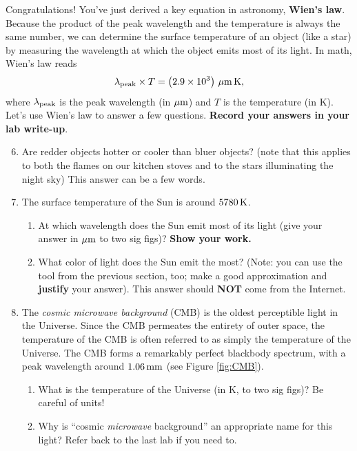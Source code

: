 \documentclass[11pt]{article}
\begin{document}
\medskip \noindent
Congratulations! You've just derived a key equation in astronomy, \textbf{Wien's law}. Because the product of the peak wavelength and the temperature is always the same number, we can determine the surface temperature of an object (like a star) by measuring the wavelength at which the object emits most of its light. In math, Wien's law reads
\begin{equation}
    \lambda_{\rm peak} \times T = \left(2.9 \times 10^3 \right) \, {\rm \mu m \, K},
\end{equation}
where $\lambda_{\rm peak}$ is the peak wavelength (in $\rm \mu m$) and $T$ is the temperature (in K). Let's use Wien's law to answer a few questions. \textbf{Record your answers in your lab write-up}.
\begin{enumerate}
    \setcounter{enumi}{5}
    
    \item Are redder objects hotter or cooler than bluer objects? (note that this applies to both the flames on our kitchen stoves and to the stars illuminating the night sky) This answer can be a few words.
    
    \item The surface temperature of the Sun is around $5780 \, {\rm K}$. 
    \begin{enumerate}
        \item At which wavelength does the Sun emit most of its light (give your answer in $\rm \mu m$ to two sig figs)? \textbf{Show your work.}
        \item What color of light does the Sun emit the most? (Note: you can use the tool from the previous section, too; make a good approximation and \textbf{justify} your answer). This answer should \textbf{NOT} come from the Internet.
    \end{enumerate} 
    
    \item The \emph{cosmic microwave background} (CMB) is the oldest perceptible light in the Universe. Since the CMB permeates the entirety of outer space, the temperature of the CMB is often referred to as simply the temperature of the Universe. The CMB forms a remarkably perfect blackbody spectrum, with a peak wavelength around $1.06 \, {\rm mm}$ (see Figure \ref{fig:CMB}). 
    \begin{enumerate}
        \item What is the temperature of the Universe (in K, to two sig figs)? Be careful of units! 
        
        \item Why is ``cosmic \emph{microwave} background'' an appropriate name for this light? Refer back to the last lab if you need to.
    \end{enumerate}
\end{enumerate}
\end{document}
